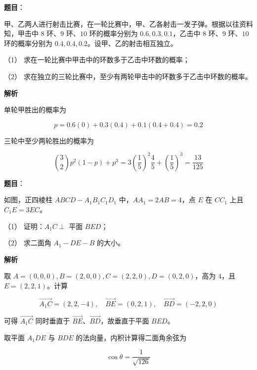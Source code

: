 \begin{answer}

\textbf{题目}：

甲、乙两人进行射击比赛，在一轮比赛中，甲、乙各射击一发子弹。根据以往资料知，甲击中 $8$ 环、$9$ 环、$10$ 环的概率分别为 $0.6,0.3,0.1$，乙击中 $8$ 环、$9$ 环、$10$ 环的概率分别为 $0.4,0.4,0.2$。设甲、乙的射击相互独立。

（1） 求在一轮比赛中甲击中的环数多于乙击中环数的概率；

（2） 求在独立的三轮比赛中，至少有两轮甲击中的环数多于乙击中环数的概率。

\textbf{解析}


单轮甲胜出的概率为

\nopagebreak[4]
\[
p=0.6(0)+0.3(0.4)+0.1(0.4+0.4)=0.2
\]


三轮中至少两轮胜出的概率为

\nopagebreak[4]
\[
\binom32p^2(1-p)+p^3
=3\left(\frac15\right)^2\frac45+\left(\frac15\right)^3
=\frac{13}{125}
\]



\end{answer}
\begin{answer}

\textbf{题目}：

如图，正四棱柱 $ABCD-A_1B_1C_1D_1$ 中，$AA_1=2AB=4$，点 $E$ 在 $CC_1$ 上且 $C_1E=3EC$。
\nopagebreak[4]
\begin{center}\end{center}
\nopagebreak[4]
（1） 证明：$A_1C\perp$ 平面 $BED$；

（2） 求二面角 $A_1-DE-B$ 的大小。

\textbf{解析}


取 $A=(0,0,0),B=(2,0,0),C=(2,2,0),D=(0,2,0)$，高为 $4$，且 $E=(2,2,1)$。计算

\nopagebreak[4]
\[
\overrightarrow{A_1C}=(2,2,-4),\quad
\overrightarrow{BE}=(0,2,1),\quad
\overrightarrow{BD}=(-2,2,0)
\]

可得 $\overrightarrow{A_1C}$ 同时垂直于 $\overrightarrow{BE}$、$\overrightarrow{BD}$，故垂直于平面 $BED$。


取平面 $A_1DE$ 与 $BDE$ 的法向量，内积计算得二面角余弦为

\nopagebreak[4]
\[
\cos\theta=\frac1{\sqrt{126}}
\]



\end{answer}
